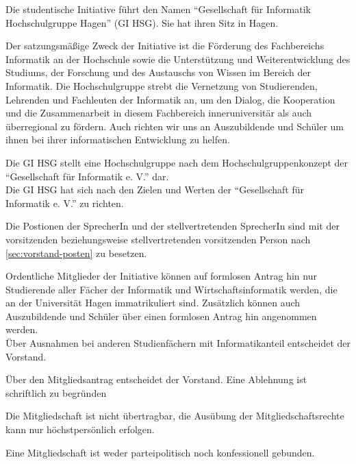 \pagestyle{fancy}
\begin{contract}
\label{sec:name}

Die studentische Initiative führt den Namen ``Gesellschaft für Informatik Hochschulgruppe Hagen'' (GI HSG).  Sie hat ihren Sitz in Hagen.


\label{sec:zweck}

Der satzungsmäßige Zweck der Initiative ist die Förderung des Fachbereichs Informatik an der Hochschule sowie die Unterstützung und Weiterentwicklung des Studiums, der Forschung und des Austauschs von Wissen im Bereich der Informatik. 
Die Hochschulgruppe strebt die Vernetzung von Studierenden, Lehrenden und Fachleuten der Informatik an, um den Dialog, die Kooperation und die Zusammenarbeit in diesem Fachbereich inneruniversitär als auch überregional zu fördern.
Auch richten wir uns an Auszubildende und Schüler um ihnen bei ihrer informatischen Entwicklung zu helfen. 

\label{sec:verhältnisGI}

Die GI HSG stellt eine Hochschulgruppe nach dem Hochschulgruppenkonzept der ``Gesellschaft für Informatik e. V.'' dar. \\
Die GI HSG hat sich nach den Zielen und Werten der ``Gesellschaft für Informatik e. V.'' zu richten.

Die Postionen der SprecherIn und der stellvertretenden SprecherIn sind mit der vorsitzenden beziehungsweise stellvertretenden vorsitzenden Person nach \ref{sec:vorstand-posten}{} zu besetzen.


Ordentliche Mitglieder der Initiative können auf formlosen Antrag hin nur Studierende aller Fächer der Informatik und Wirtschaftsinformatik werden, die an der Universität Hagen immatrikuliert sind. Zusätzlich können auch Auszubildende und Schüler über einen formlosen Antrag hin angenommen werden. \\
Über Ausnahmen bei anderen Studienfächern mit Informatikanteil entscheidet der Vorstand.

Über den Mitgliedsantrag entscheidet der Vorstand. Eine Ablehnung ist schriftlich zu begründen

Die Mitgliedschaft ist nicht übertragbar, die Ausübung der Mitgliedschaftsrechte kann nur höchstpersönlich erfolgen. 

Eine Mitgliedschaft ist weder parteipolitisch noch konfessionell gebunden.


\end{contract}
